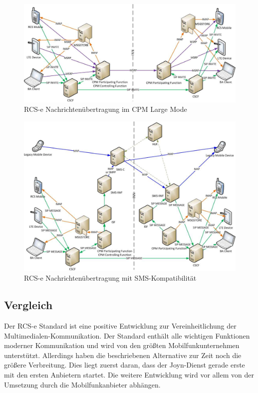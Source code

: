 \documentclass[german,12pt,a4paper]{article}
\begin{document}
 \begin{figure}
     \centering
     \includegraphics[width=\textwidth]{img/rcs-e-large}
     \caption{RCS-e Nachrichtenübertragung im CPM Large Mode \cite{rcs:spec}}
     \label{fig:rcs-e-large}
 \end{figure}

 \begin{figure}
     \centering
     \includegraphics[width=\textwidth]{img/rcs-e-sms}
     \caption{RCS-e Nachrichtenübertragung mit SMS-Kompatibilität \cite{rcs:spec}}
     \label{fig:rcs-e-sms}
 \end{figure}



 \subsection{Vergleich} %
 \label{sub:vergleich}

    Der RCS-e Standard ist eine positive Entwicklung zur Vereinheitlichung der
    Multimedialen-Kommunikation. Der Standard enthält alle wichtigen Funktionen moderner
    Kommunikation und wird von den größten Mobilfunkunternehmen unterstützt. Allerdings
    haben die beschriebenen Alternative zur Zeit noch die größere Verbreitung. Dies liegt
    zuerst daran, dass der Joyn-Dienst gerade erste mit den ersten Anbietern startet. Die
    weitere Entwicklung wird vor allem von der Umsetzung durch die Mobilfunkanbieter
    abhängen.
\end{document}
